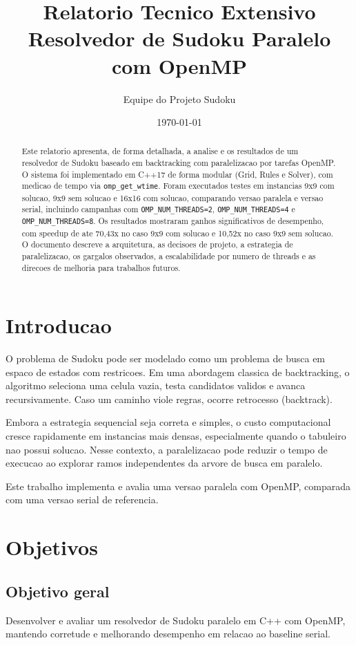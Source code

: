 \documentclass[11pt,a4paper]{article}
\title{Relatorio Tecnico Extensivo\\Resolvedor de Sudoku Paralelo com OpenMP}
\author{Equipe do Projeto Sudoku}
\date{\today}
\begin{document}
\maketitle

\begin{abstract}
Este relatorio apresenta, de forma detalhada, a analise e os resultados de um resolvedor de Sudoku baseado em backtracking com paralelizacao por tarefas OpenMP. O sistema foi implementado em C++17 de forma modular (Grid, Rules e Solver), com medicao de tempo via \texttt{omp\_get\_wtime}. Foram executados testes em instancias 9x9 com solucao, 9x9 sem solucao e 16x16 com solucao, comparando versao paralela e versao serial, incluindo campanhas com \texttt{OMP\_NUM\_THREADS=2}, \texttt{OMP\_NUM\_THREADS=4} e \texttt{OMP\_NUM\_THREADS=8}. Os resultados mostraram ganhos significativos de desempenho, com speedup de ate 70,43x no caso 9x9 com solucao e 10,52x no caso 9x9 sem solucao. O documento descreve a arquitetura, as decisoes de projeto, a estrategia de paralelizacao, os gargalos observados, a escalabilidade por numero de threads e as direcoes de melhoria para trabalhos futuros.
\end{abstract}

\tableofcontents
\newpage

\section{Introducao}
O problema de Sudoku pode ser modelado como um problema de busca em espaco de estados com restricoes. Em uma abordagem classica de backtracking, o algoritmo seleciona uma celula vazia, testa candidatos validos e avanca recursivamente. Caso um caminho viole regras, ocorre retrocesso (backtrack).

Embora a estrategia sequencial seja correta e simples, o custo computacional cresce rapidamente em instancias mais densas, especialmente quando o tabuleiro nao possui solucao. Nesse contexto, a paralelizacao pode reduzir o tempo de execucao ao explorar ramos independentes da arvore de busca em paralelo.

Este trabalho implementa e avalia uma versao paralela com OpenMP, comparada com uma versao serial de referencia.

\section{Objetivos}
\subsection{Objetivo geral}
Desenvolver e avaliar um resolvedor de Sudoku paralelo em C++ com OpenMP, mantendo corretude e melhorando desempenho em relacao ao baseline serial.
\end{document}
